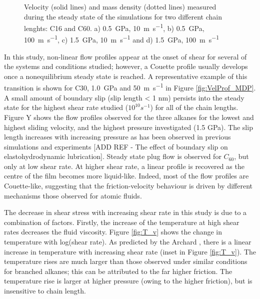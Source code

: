 \documentclass[aps,prb,reprint,superscriptaddress, a4paper]{revtex4-1}
\begin{document}
\begin{figure}[h]
\begin{center}
		\caption{Velocity (solid lines) and mass density (dotted lines) measured during the steady state of the simulations for two different chain lenghts: C16 and C60. a) \SI{0.5}{\giga\pascal},  \SI{10}{\meter\per\second},   b) \SI{0.5}{\giga\pascal},  \SI{100}{\meter\per\second}, c) \SI{1.5}{\giga\pascal},  \SI{10}{\meter\per\second} and    d) \SI{1.5}{\giga\pascal},  \SI{100}{\meter\per\second}} 
		\label{fig:VelProf_MDP2}
	\end{center}
 \end{figure}


In this study, non-linear flow profiles appear at the onset of shear for several of the systems and conditions studied; however, a Couette profile usually develops once a nonequilibrium steady state is reached. A representative example of this transition is shown for C30,  \SI{1.0}{\giga\pascal} and  \SI{50}{\meter\per\second} in Figure \ref{fig:VelProf_MDP}. A small amount of boundary slip (slip length < 1 nm) persists into the steady state for the highest shear rate studied ($10^{10} s^{-1}$) for all of the chain lengths. Figure Y shows the flow profiles observed for the three alkanes for the lowest and highest sliding velocity, and the highest pressure investigated (1.5 GPa). The slip length increases with increasing pressure as has been observed in previous simulations\cite{Ta2017} and experiments [ADD REF - The effect of boundary slip on elastohydrodynamic lubrication]. Steady state plug flow is observed for $C_60$, but only at low shear rate. At higher shear rate, a linear profile is recovered as the centre of the film becomes more liquid-like\cite{Ewen2017a}. Indeed, most of the flow profiles are Couette-like, suggesting that the friction-velocity behaviour is driven by different mechanisms those observed for atomic fluids\cite{Heyes2012,Gattinoni2013,Mackowiak2016}.

The decrease in shear stress with increasing shear rate in this study is due to a combination of factors. Firstly, the increase of the temperature at high shear rates decreases the fluid viscosity. Figure \ref{fig:T_v} shows the change in temperature with log(shear rate). As predicted by the Archard \cite{Archard1959}, there is a linear increase in temperature with increasing shear rate (inset in Figure \ref{fig:T_v}). The temperature rises are much larger than those observed under similar conditions for branched alkanes\cite{Ewen2017a}; this can be attributed to the far higher friction. The temperature rise is larger at higher pressure \cite{Archard1959} (owing to the higher friction), but is insensitive to chain length.
\end{document}
